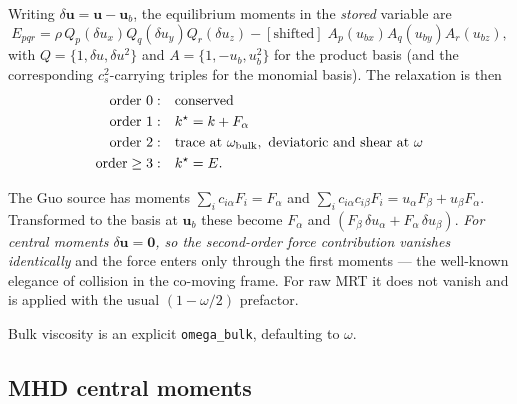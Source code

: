 \documentclass[11pt,a4paper]{article}
\newcommand{\code}[1]{\texttt{\small #1}}
\newcommand{\cs}{c_s}
\newcommand{\uu}{\bm{u}}
\begin{document}
Writing $\delta\uu = \uu - \uu_b$, the equilibrium moments in the \emph{stored}
variable are
\begin{equation}
  E_{pqr} = \rho\,Q_p(\delta u_x)Q_q(\delta u_y)Q_r(\delta u_z)
          - [\text{shifted}]\;A_p(u_{bx})A_q(u_{by})A_r(u_{bz}),
\end{equation}
with $Q=\{1,\delta u,\delta u^2\}$ and $A=\{1,-u_b,u_b^2\}$ for the product
basis (and the corresponding $\cs^2$-carrying triples for the monomial basis).
The relaxation is then
\begin{equation}
\begin{aligned}
  \text{order }0:&\quad \text{conserved} \\
  \text{order }1:&\quad k^{\star} = k + F_\alpha \\
  \text{order }2:&\quad \text{trace at }\omega_{\rm bulk},\ \text{deviatoric and shear at }\omega \\
  \text{order}\geq3:&\quad k^{\star} = E .
\end{aligned}
\end{equation}

The Guo source has moments $\sum_i c_{i\alpha}F_i = F_\alpha$ and
$\sum_i c_{i\alpha}c_{i\beta}F_i = u_\alpha F_\beta + u_\beta F_\alpha$.
Transformed to the basis at $\uu_b$ these become $F_\alpha$ and
$(F_\beta\,\delta u_\alpha + F_\alpha\,\delta u_\beta)$. \emph{For central moments
$\delta\uu=\bm0$, so the second-order force contribution vanishes identically}
and the force enters only through the first moments --- the well-known elegance
of collision in the co-moving frame. For raw MRT it does not vanish and is
applied with the usual $(1-\omega/2)$ prefactor.

Bulk viscosity is an explicit \code{omega\_bulk}, defaulting to $\omega$.

\subsection{MHD central moments}
\label{sec:mhdcm}
\end{document}
